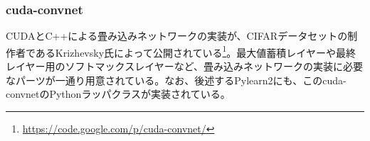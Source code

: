 \subsubsection{cuda-convnet}
CUDAとC++による畳み込みネットワークの実装が、CIFARデータセットの制作者であるKrizhevsky氏によって公開されている\footnote{\url{https://code.google.com/p/cuda-convnet/}}。最大値蓄積レイヤーや最終レイヤー用のソフトマックスレイヤーなど、畳み込みネットワークの実装に必要なパーツが一通り用意されている。なお、後述するPylearn2にも、このcuda-convnetのPythonラッパクラスが実装されている。

